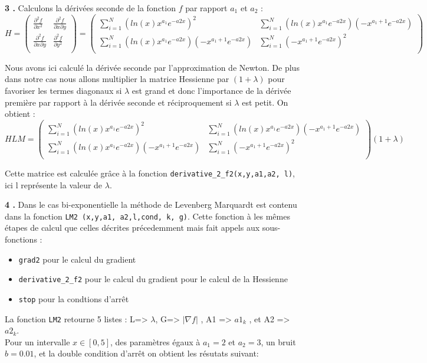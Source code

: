 \documentclass[12pt]{article}
\begin{document}
 
  \textbf{\color{brick}3 .} Calculons la dérivées seconde de la fonction $f$ par rapport $a_1$ et $a_2$ :
  $$H = \begin{pmatrix} 
\frac{\partial^2 f}{\partial x^2} & \frac{\partial^2 f}{\partial x\partial y} \\
\frac{\partial^2 f}{\partial x \partial y} & \frac{\partial^2 f}{\partial y^2} \\
\end{pmatrix} =
\begin{pmatrix} 
\sum_{i=1}^N (ln(x) x^{a_1} e^{-a2x})^2 & \sum_{i=1}^N (ln(x) x^{a_1} e^{-a2x})(-x^{a_1+1}e^{-a2x})  \\
 \sum_{i=1}^N (ln(x) x^{a_1} e^{-a2x})(-x^{a_1+1}e^{-a2x}) & \sum_{i=1}^N (-x^{a_1+1}e^{-a2x})^2 \\
\end{pmatrix}
$$

Nous avons ici calculé la dérivée seconde par l'approximation de Newton. De plus dans notre cas nous allons multiplier la matrice Hessienne par $(1 + \lambda)$ pour favoriser les termes diagonaux si $\lambda$ est grand et donc l'importance de la dérivée première par rapport à la dérivée seconde et réciproquement si $\lambda$ est petit. On obtient :
$$HLM = 
\begin{pmatrix} 
\sum_{i=1}^N (ln(x) x^{a_1} e^{-a2x})^2 & \sum_{i=1}^N (ln(x) x^{a_1} e^{-a2x})(-x^{a_1+1}e^{-a2x})  \\
 \sum_{i=1}^N (ln(x) x^{a_1} e^{-a2x})(-x^{a_1+1}e^{-a2x}) & \sum_{i=1}^N (-x^{a_1+1}e^{-a2x})^2 \\
\end{pmatrix} (1 +\lambda)
$$
 
 Cette matrice est calculée grâce à la fonction \verb|derivative_2_f2(x,y,a1,a2, l)|, ici l représente la valeur de $\lambda$.
 
 \textbf{\color{brick}4 .}
Dans le cas bi-exponentielle la méthode de Levenberg Marquardt est contenu dans la fonction \verb|LM2 (x,y,a1, a2,l,cond, k, g)|. Cette fonction à les mêmes étapes de calcul que celles décrites précedemment mais fait appels aux sous-fonctions :
\begin{itemize}
    \item \verb|grad2| pour le calcul du gradient 
    \item \verb|derivative_2_f2| pour le calcul du gradient pour le calcul de la Hessienne
    \item \verb|stop| pour la condtions d'arrêt
\end{itemize}
La fonction \verb|LM2| retourne 5 listes : L=> $\lambda$, G=> $|\nabla f|$ , A1 => $a1_k$ , et A2 => $a2_k$.\\
Pour un intervalle $x\in [0,5]$, des paramètres égaux à $a_1 = 2 $ et  $a_2 = 3 $,  un bruit $b =0.01$, et la double condition d'arrêt on obtient les résutats suivant:
 
\end{document}
